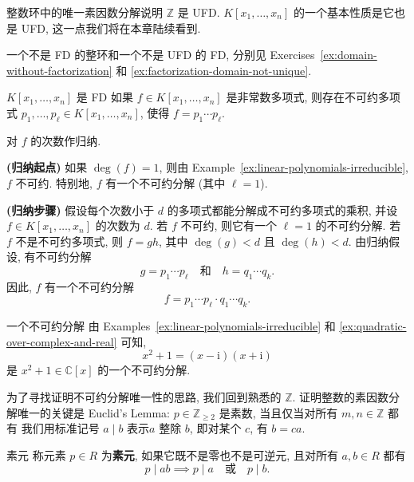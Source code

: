 整数环中的唯一素因数分解说明 $\mathbb{Z}$ 是 UFD. $K[x_{1},\ldots,x_{n}]$ 的一个基本性质是它也是 UFD, 这一点我们将在本章陆续看到.

%
  {一个不是 FD 的整环和一个不是 UFD 的 FD, 分别见 Exercises~\ref{ex:domain-without-factorization} 和 \ref{ex:factorization-domain-not-unique}.}

\begin{Proposition}{{\textmd{$K[x_{1},\ldots,x_{n}]$} 是 FD}}\label{prop:polynomial-factorization-exists}
  如果 $f\in K[x_{1},\ldots,x_{n}]$ 是非常数多项式, 则存在不可约多项式 $p_{1},\ldots,p_{\ell}\in K[x_{1},\ldots,x_{n}]$, 使得 $f=p_{1}\cdots p_{\ell}$.
\end{Proposition}

\begin{Proof}
  对 $f$ 的次数作归纳.

  \textbf{(归纳起点)} 如果 $\deg(f)=1$, 则由 Example~\ref{ex:linear-polynomials-irreducible}, $f$ 不可约. 特别地, $f$ 有一个不可约分解 (其中 $\ell=1$).

  \textbf{(归纳步骤)} 假设每个次数小于 $d$ 的多项式都能分解成不可约多项式的乘积, 并设 $f\in K[x_{1},\ldots,x_{n}]$ 的次数为 $d$. 若 $f$ 不可约, 则它有一个 $\ell=1$ 的不可约分解. 若 $f$ 不是不可约多项式, 则 $f=gh$, 其中 $\deg(g)<d$ 且 $\deg(h)<d$. 由归纳假设, 有不可约分解
  \[
    g=p_{1}\cdots p_{\ell}\quad\text{和}\quad h=q_{1}\cdots q_{k}.
  \]
  因此, $f$ 有一个不可约分解
  \[
    f=p_{1}\cdots p_{\ell}\cdot q_{1}\cdots q_{k}.
  \]
\end{Proof}

\begin{Example}{一个不可约分解}\label{ex:irreducible-factorization-complex-quadratic}
  由 Examples~\ref{ex:linear-polynomials-irreducible} 和 \ref{ex:quadratic-over-complex-and-real} 可知,
  \[
    x^{2}+1=(x-\mathrm{i})(x+\mathrm{i})
  \]
  是 $x^{2}+1\in\mathbb{C}[x]$ 的一个不可约分解.
\end{Example}

为了寻找证明不可约分解唯一性的思路, 我们回到熟悉的 $\mathbb{Z}$. 证明整数的素因数分解唯一的关键是 Euclid's Lemma: $p\in\mathbb{Z}_{\geq2}$ 是素数, 当且仅当对所有 $m,n\in\mathbb{Z}$ 都有
%
  {我们用标准记号 $a\mid b$ 表示\textquotedbl{}$a$ 整除 $b$\textquotedbl{}, 即对某个 $c$, 有 $b=ca$.}

\begin{Definition}{素元}\label{def:prime-element}
  称元素 $p\in R$ 为\textbf{素元}, 如果它既不是零也不是可逆元, 且对所有 $a,b\in R$ 都有
  \[
    p\mid ab\implies p\mid a\quad\text{或}\quad p\mid b.
  \]
\end{Definition}

